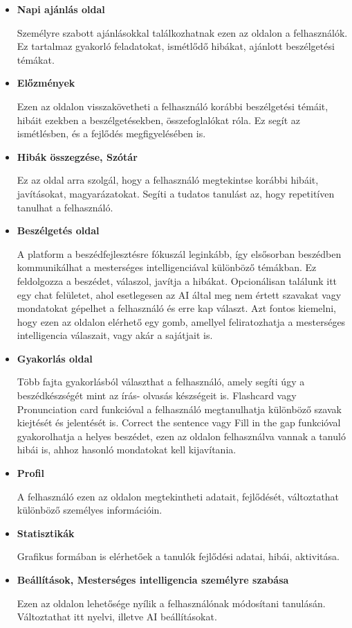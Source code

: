 \begin{itemize}
    \item \textbf{Napi ajánlás oldal}

    Személyre szabott ajánlásokkal találkozhatnak ezen az oldalon a felhasználók. Ez tartalmaz gyakorló feladatokat, ismétlődő hibákat, ajánlott beszélgetési témákat.

\newpage
    \item \textbf{Előzmények}

    Ezen az oldalon visszakövetheti a felhasználó korábbi beszélgetési témáit, hibáit ezekben a beszélgetésekben, összefoglalókat róla. Ez segít az ismétlésben, és a fejlődés megfigyelésében is.

    \item \textbf{Hibák összegzése, Szótár}

    Ez az oldal arra szolgál, hogy a felhasználó megtekintse korábbi hibáit, javításokat, magyarázatokat. Segíti a tudatos tanulást az, hogy repetitíven  tanulhat a felhasználó.

    \item \textbf{Beszélgetés oldal}

    A platform a beszédfejlesztésre fókuszál leginkább, így elsősorban beszédben kommunikálhat a mesterséges intelligenciával különböző témákban. Ez feldolgozza a beszédet, válaszol, javítja a hibákat. Opcionálisan találunk itt egy chat felületet, ahol esetlegesen az AI által meg nem értett szavakat vagy mondatokat gépelhet a felhasználó és erre kap választ. Azt fontos kiemelni, hogy ezen az oldalon elérhető egy gomb, amellyel feliratozhatja a mesterséges intelligencia válaszait, vagy akár a sajátjait is.

    \item \textbf{Gyakorlás oldal}

    Több fajta gyakorlásból választhat a felhasználó, amely segíti úgy a beszédkészségét mint az írás- olvasás készségeit is. Flashcard vagy Pronunciation card funkcióval a felhasználó megtanulhatja különböző szavak kiejtését és jelentését is. Correct the sentence vagy Fill in the gap funkcióval gyakorolhatja a helyes beszédet, ezen az oldalon felhasználva vannak a tanuló hibái is, ahhoz hasonló mondatokat kell kijavítania. 

    \item \textbf{Profil}

    A felhasználó ezen az oldalon megtekintheti adatait, fejlődését, változtathat különböző személyes információin.

    \item \textbf{Statisztikák}

    Grafikus formában is elérhetőek a tanulók fejlődési adatai, hibái, aktivitása.

    \item \textbf{Beállítások, Mesterséges intelligencia személyre szabása}

    Ezen az oldalon lehetősége nyílik a felhasználónak módosítani tanulásán. Változtathat itt nyelvi, illetve AI beállításokat.
    
\end{itemize}

